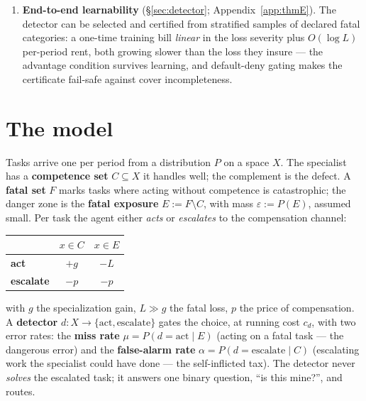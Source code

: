 \documentclass[11pt]{article}
\theoremstyle{plain}
\theoremstyle{definition}
\begin{document}
\begin{enumerate}
   premium $=$ support function of the detector class's ROC set at an
   economic price vector, with removability a coefficient, not a yes/no. The
   gap between menu and machine decomposes into two named obstructions with
   exact formulas, a router bound that makes the theory recurse on itself,
   and a least-favorable-mixture duality: \textbf{a coin buys back the gluing
   failure, never the cross-leak.}
\item \textbf{End-to-end learnability} (\S\ref{sec:detector}; Appendix~\ref{app:thmE}). The detector can be
   selected and certified from stratified samples of declared fatal
   categories: a one-time training bill \emph{linear} in the loss severity plus
   $O(\log L)$ per-period rent, both growing slower than the loss they
   insure --- the advantage condition survives learning, and default-deny
   gating makes the certificate fail-safe against cover incompleteness.
\end{enumerate}

\section{The model}\label{sec:model}

Tasks arrive one per period from a distribution $P$ on a space $X$. The
specialist has a \textbf{competence set} $C \subseteq X$ it handles well; the
complement is the defect. A \textbf{fatal set} $F$ marks tasks where acting without
competence is catastrophic; the danger zone is the \textbf{fatal exposure}
$E := F \setminus C$, with mass $\varepsilon := P(E)$, assumed small. Per task
the agent either \emph{acts} or \emph{escalates} to the compensation channel:

\begin{center}
\begin{tabular}{lcc}
\toprule
 & $x \in C$ & $x \in E$ \\
\midrule
\textbf{act} & $+g$ & $-L$ \\
\textbf{escalate} & $-p$ & $-p$ \\
\bottomrule
\end{tabular}
\end{center}

\noindent
with $g$ the specialization gain, $L \gg g$ the fatal loss, $p$ the price of
compensation. A \textbf{detector} $d : X \to \{\text{act}, \text{escalate}\}$ gates
the choice, at running cost $c_d$, with two error rates: the \textbf{miss rate}
$\mu = P(d{=}\text{act} \mid E)$ (acting on a fatal task --- the dangerous
error) and the \textbf{false-alarm rate} $\alpha = P(d{=}\text{escalate} \mid C)$
(escalating work the specialist could have done --- the self-inflicted tax). The
detector never \emph{solves} the escalated task; it answers one binary question,
``is this mine?'', and routes.
\end{document}
